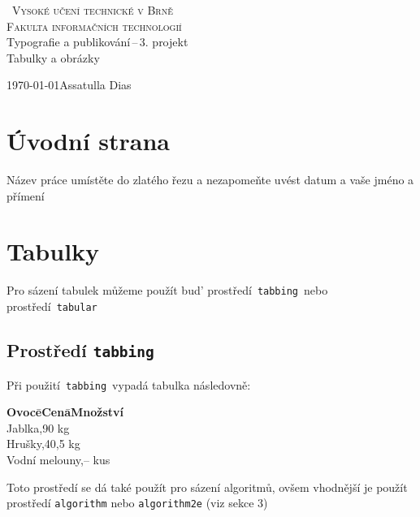\documentclass[a4paper,11pt]{article}
\begin{document}
    \begin{titlepage}
        \begin{center}
            \textsc{\Huge ~Vysoké učení technické v Brně \\[0.3em]
            \huge{Fakulta informačních technologií}}\\
            {\LARGE Typografie a publikování\,--\,3. projekt\\[0.3em]
            \Huge{Tabulky a obrázky}}
        \end{center}
        {\Large\today \hfill Assatulla Dias }
    \end{titlepage}
    \newpage
    
    \section{Úvodní strana}
    Název práce umístěte do zlatého řezu a nezapomeňte uvést  datum a vaše jméno a přímení

    \section{Tabulky}
    Pro sázení tabulek můžeme použít bud' prostředí~\verb|tabbing|~nebo prostředí~\verb|tabular|
    
    \subsection{Prostředí \texttt{tabbing}}
    Při použití~\verb|tabbing|~vypadá tabulka následovně:
    \begin{tabbing}
        \label{tabbing:Ovoce}
        \textbf{Ovoce}\=\qquad\qquad\quad\textbf{Cena}\=\qquad\textbf{Množství} \\
        Jablka\>\qquad\qquad{},90\> kg \\
        Hrušky\>\qquad\qquad{},40\>,5 kg \\
        Vodní melouny\>\qquad\qquad{},--\> kus \\
    \end{tabbing}
    Toto prostředí se dá také použít pro sázení algoritmů, ovšem vhodnější je použít prostředí \verb|algorithm| nebo \verb|algorithm2e| (viz sekce 3)
    
\end{document}
